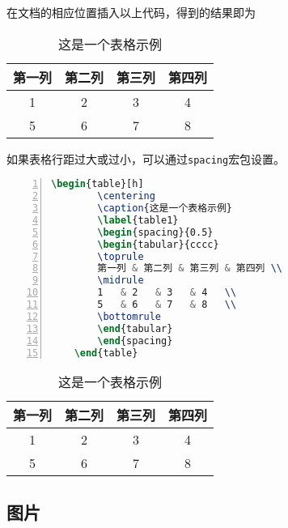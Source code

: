 在文档的相应位置插入以上代码，得到的结果即为

\begin{table}[h]
    \centering
    \caption{这是一个表格示例}
    \label{table1}
    \begin{tabular}{cccc}
    \toprule
    第一列 & 第二列 & 第三列 & 第四列 \\
    \midrule
    1   & 2   & 3   & 4   \\
    5   & 6   & 7   & 8   \\
    \bottomrule
    \end{tabular}
\end{table}

如果表格行距过大或过小，可以通过\texttt{spacing}宏包设置。

\begin{lstlisting}[language=tex, breaklines=true, basicstyle=\ttfamily, numbers=left, numberstyle=\tiny, frame=shadowbox]
    \begin{table}[h]
        \centering
        \caption{这是一个表格示例}
        \label{table1}
        \begin{spacing}{0.5}
        \begin{tabular}{cccc}
        \toprule
        第一列 & 第二列 & 第三列 & 第四列 \\
        \midrule
        1   & 2   & 3   & 4   \\
        5   & 6   & 7   & 8   \\
        \bottomrule
        \end{tabular}
        \end{spacing}
    \end{table}
\end{lstlisting}

\begin{table}[h]
    \centering
    \caption{这是一个表格示例}
    \label{table1}
    \begin{spacing}{0.5}
    \begin{tabular}{cccc}
    \toprule
    第一列 & 第二列 & 第三列 & 第四列 \\
    \midrule
    1   & 2   & 3   & 4   \\
    5   & 6   & 7   & 8   \\
    \bottomrule
    \end{tabular}
    \end{spacing}
\end{table}

\subsection{图片}

